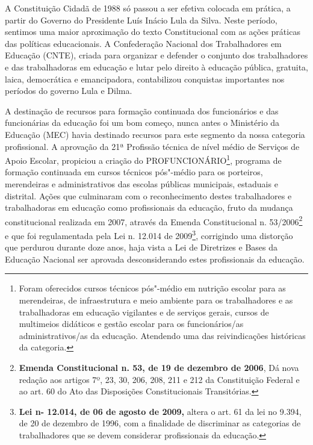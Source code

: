 A Constituição Cidadã de 1988 só passou a ser efetiva colocada em
prática, a partir do Governo do Presidente Luís Inácio Lula da Silva.
Neste período, sentimos uma maior aproximação do texto Constitucional
com as ações práticas das políticas educacionais. A Confederação
Nacional dos Trabalhadores em Educação (CNTE), criada para organizar e
defender o conjunto dos trabalhadores e das trabalhadoras em educação e
lutar pelo direito à educação pública, gratuita, laica, democrática e
emancipadora, contabilizou conquistas importantes nos períodos do
governo Lula e Dilma.

A destinação de recursos para formação continuada dos funcionários e das
funcionárias da educação foi um bom começo, nunca antes o Ministério da
Educação (MEC) havia destinado recursos para este segmento da nossa
categoria profissional. A aprovação da 21ª Profissão técnica de nível
médio de Serviços de Apoio Escolar, propiciou a criação do
PROFUNCIONÁRIO\footnote{Foram oferecidos cursos técnicos pós"-médio em
  nutrição escolar para as merendeiras, de infraestrutura e meio
  ambiente para os trabalhadores e as trabalhadoras em educação
  vigilantes e de serviços gerais, cursos de multimeios didáticos e
  gestão escolar para os funcionários/as administrativos/as da educação.
  Atendendo uma das reivindicações históricas da categoria.}, programa
de formação continuada em cursos técnicos pós"-médio para os porteiros,
merendeiras e administrativos das escolas públicas municipais, estaduais
e distrital. Ações que culminaram com o reconhecimento destes
trabalhadores e trabalhadoras em educação como profissionais da
educação, fruto da mudança constitucional realizada em 2007, através da
Emenda Constitucional n. 53/2006\footnote{\textbf{Emenda Constitucional
  n. 53, de 19 de dezembro de 2006}, Dá nova redação aos artigos 7º, 23,
  30, 206, 208, 211 e 212 da Constituição Federal e ao art. 60 do Ato
  das Disposições Constitucionais Transitórias.} e que foi regulamentada
pela Lei n. 12.014 de 2009\footnote{\textbf{Lei n- 12.014, de 06 de
  agosto de 2009,} altera o art. 61 da lei no 9.394, de 20 de dezembro
  de 1996, com a finalidade de discriminar as categorias de
  trabalhadores que se devem considerar profissionais da educação.},
corrigindo uma distorção que perdurou durante doze anos, haja vista a
Lei de Diretrizes e Bases da Educação Nacional ser aprovada
desconsiderando estes profissionais da educação.

